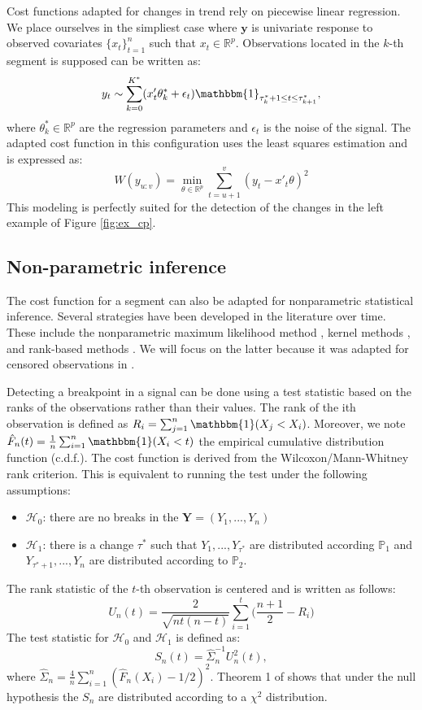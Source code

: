 Cost functions adapted for changes in trend rely on piecewise linear regression. We place ourselves in the simpliest case where $\bm y$ is univariate response to observed covariates $\{x_t\}_{t=1}^n$ such that $x_t \in \mathbb{R}^p$. Observations located in the $k$-th segment is supposed can be written as:   
$$y_t \sim \sum_{k=0}^{K^*}(x'_t\theta^*_k + \epsilon_t)\mathbbm{1}_{\tau^*_{k}+1\leq t \leq \tau^*_{k+1}},$$
where $\theta^*_k \in \mathbb{R}^p$ are the regression parameters and $\epsilon_t$ is the noise of the signal. The adapted cost function in this configuration uses the least squares estimation and is expressed as:
$$W(y_{u:v}) = \min_{\theta \in \mathbb{R}^p}\sum_{t=u+1}^v(y_t-x'_t\theta)^2$$ 
This modeling is perfectly suited for the detection of the changes in the left example of Figure \ref{fig:ex_cp}. 

\subsection{Non-parametric inference}

The cost function for a segment can also be adapted for nonparametric statistical inference. Several strategies have been developed in the literature over time. These include the nonparametric maximum likelihood method \citep{Zou2014,Einmahl2003}, kernel methods \citep{Harchaoui2008,li2015m}, and rank-based methods \citep{Pettitt1980,Wang2019}. We will focus on the latter because it was adapted for censored observations in \cite{lung2015}.  

Detecting a breakpoint in a signal can be done using a test statistic based on the ranks of the observations rather than their values. The rank of the ith observation is defined as $R_i = \sum_{j =1}^n\mathbbm{1}(X_j < X_i)$. Moreover, we note $\hat{F}_n(t) = \frac{1}{n}\sum_{i = 1}^n\mathbbm{1}(X_i < t)$ the empirical cumulative distribution function (c.d.f.). The cost function is derived from the Wilcoxon/Mann-Whitney rank criterion. This is equivalent to running the test under the following assumptions: 
\begin{itemize}
  \item $\mathcal{H}_0$: there are no breaks in the $\bm Y = (Y_1,...,Y_n)$ 
  \item $\mathcal{H}_1$: there is a change $\tau^*$ such that $Y_1,...,Y_{\tau^*}$ are distributed according $\mathbb{P}_1$ and $Y_{\tau^*+1},...,Y_{n}$ are distributed according to $\mathbb{P}_2$. 
\end{itemize}
The rank statistic of the $t$-th observation is centered and is written as follows:
\begin{equation}\label{chp2:statranknp}
  U_n(t) = \frac{2}{\sqrt{nt(n-t)}}\sum_{i = 1}^{t}\bigg(\frac{n+1}{2} - R_i\bigg)
\end{equation}
The test statistic for $\mathcal{H}_0$ and $\mathcal{H}_1$ is defined as:
\begin{equation}\label{chp2:stattestnp}
  S_n(t) = \hat{\Sigma}_n^{-1} U^2_n(t),
\end{equation}
where $\hat{\Sigma}_n = \frac{4}{n}\sum_{i=1}^n(\hat{F}_n(X_i)-1/2)^2$. Theorem 1 of \cite{lung2015} shows that under the null hypothesis the $S_n$ are distributed according to a $\chi^2$ distribution.

